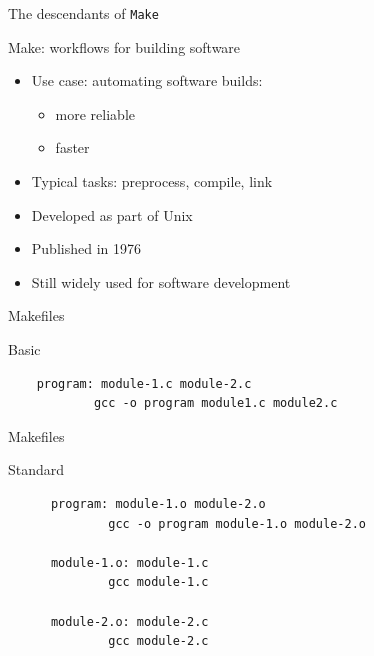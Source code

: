 \documentclass[aspectratio=169]{beamer}
\begin{document}
\begin{frame}{}

  \begin{center}
  \Large The descendants of \texttt{Make}
  \end{center}

\end{frame}

\begin{frame}{Make: workflows for building software}

  \begin{itemize}
  \item Use case: automating software builds:
    \begin{itemize}
    \item more reliable
    \item faster
    \end{itemize}
  \item Typical tasks: preprocess, compile, link
  \item Developed as part of Unix
  \item Published in 1976
  \item Still widely used for software development
  \end{itemize}

\end{frame}

\begin{frame}[fragile]{Makefiles}

  \begin{block}{Basic}
    \begin{lstlisting}
    program: module-1.c module-2.c
            gcc -o program module1.c module2.c
    \end{lstlisting}
  \end{block}

\end{frame}

\begin{frame}[fragile]{Makefiles}

  \begin{block}{Standard}
    \begin{lstlisting}
      program: module-1.o module-2.o
              gcc -o program module-1.o module-2.o

      module-1.o: module-1.c
              gcc module-1.c

      module-2.o: module-2.c
              gcc module-2.c
    \end{lstlisting}
  \end{block}

\end{frame}
\end{document}
